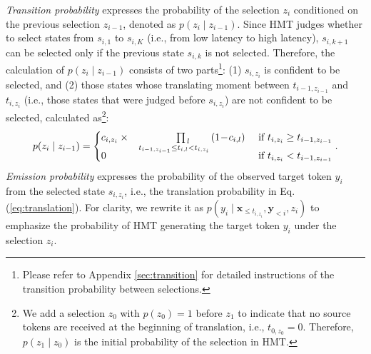 \documentclass{article} %
\begin{document}
\emph{Transition probability} expresses the probability of the selection $z_{i}$ conditioned on the previous selection $z_{i-1}$, denoted as $p\!\left ( z_{i}\mid z_{i-1}  \right )$. Since HMT judges whether to select states from $s_{i,1}$ to $s_{i,K}$ (i.e., from low latency to high latency), \vspace{-0.2mm}$s_{i,k+1}$ can be selected only if the previous state $s_{i,k}$ is not selected. Therefore, the calculation of $p\!\left ( z_{i}\mid z_{i-1}  \right )$ consists of two parts\footnote{Please refer to Appendix \ref{sec:transition} for detailed instructions of the transition probability between selections.}: (1) $s_{i,z_{i}}$ is confident to be selected, and (2) \vspace{-0.3mm}those states whose translating moment between $t_{i-1,z_{i-1}}$ and $t_{i,z_{i}}$ (i.e., those states that were judged before $s_{i,z_{i}}$) are not confident to be selected, calculated as\footnote{We add a selection $z_{0}$ with $p\!\left ( z_{0} \right )\!=\!1$ before $z_{1}$ to indicate that no source tokens are received at the beginning of translation, i.e., $t_{0,z_{0}}\!=\!0$. Therefore, $p\!\left ( z_{1}\mid z_{0}  \right )$ is the initial probability of the selection in HMT.}:
\vspace{-0.1mm}
\begin{gather}
    p\!\left ( z_{i}\mid z_{i-1}  \right )=\begin{cases}
\vspace{-2mm}c_{i,z_{i}}\times \;\;\; \underset{t_{i-1,z_{i-1}}\leq t_{i,l}<t_{i,z_{i}}\;\;\;\;\;\;\;\;}{\prod_{\,l}} \!\!\!\!\!\!\!\!\!\!\!\left ( 1\!-\!c_{i,l} \right )& \text{ if } t_{i,z_{i}}\geq  t_{i-1,z_{i-1}} \\
0 & \text{ if } t_{i,z_{i}}< t_{i-1,z_{i-1}}
\end{cases}. \label{eq:transition}
\vspace{-0.1mm}
\end{gather}
\emph{Emission probability} expresses the probability of the observed target token $y_{i}$ from the selected state $s_{i,z_{i}}$, i.e., the translation probability in Eq.(\ref{eq:translation}). For clarity, we rewrite it as $p\!\left (y_{i}\mid \mathbf{x}_{\leq t_{i,z_{i}}},\mathbf{y}_{<i},z_{i}  \right )$ to emphasize the probability of HMT generating the target token $y_{i}$ under the selection $z_{i}$.
\end{document}
